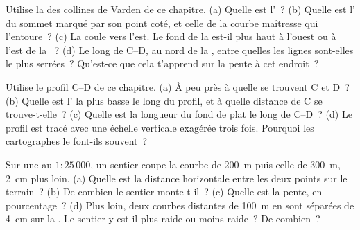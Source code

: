 \begin{exercise}[$\star\star$]\label{exo:g9:maps-of-the-earth:6}
Utilise la  des collines de Varden de ce chapitre.
(a) Quelle est l'~? (b) Quelle est l' du sommet marqué
par son point coté, et celle de la courbe maîtresse qui l'entoure~?
(c) La  coule vers l'est. Le fond de la  est-il plus haut à
l'ouest ou à l'est de la ~? (d) Le long de C--D, au nord de la
, entre quelles  les lignes sont-elles le plus
serrées~? Qu'est-ce que cela t'apprend sur la pente à cet endroit~?
\end{exercise}

\begin{exercise}[$\star\star$]\label{exo:g9:maps-of-the-earth:7}
Utilise le profil C--D de ce chapitre. (a) À peu près à quelle  se
trouvent C et D~? (b) Quelle est l' la plus basse le long du
profil, et à quelle distance de C se trouve-t-elle~? (c) Quelle est la
longueur du fond de  plat le long de C--D~? (d) Le profil est tracé
avec une échelle verticale exagérée trois fois. Pourquoi les cartographes
le font-ils souvent~?
\end{exercise}

\begin{exercise}[$\star\star$]\label{exo:g9:maps-of-the-earth:8}
Sur une  au $1 : 25\,000$, un sentier coupe la courbe de \qty{200}{m}
puis celle de \qty{300}{m}, \qty{2}{cm} plus loin. (a) Quelle est la
distance horizontale entre les deux points sur le terrain~? (b) De
combien le sentier monte-t-il~? (c) Quelle est la pente, en
pourcentage~? (d) Plus loin, deux courbes distantes de \qty{100}{m} en
 sont séparées de \qty{4}{cm} sur la . Le sentier y est-il
plus raide ou moins raide~? De combien~?
\end{exercise}

